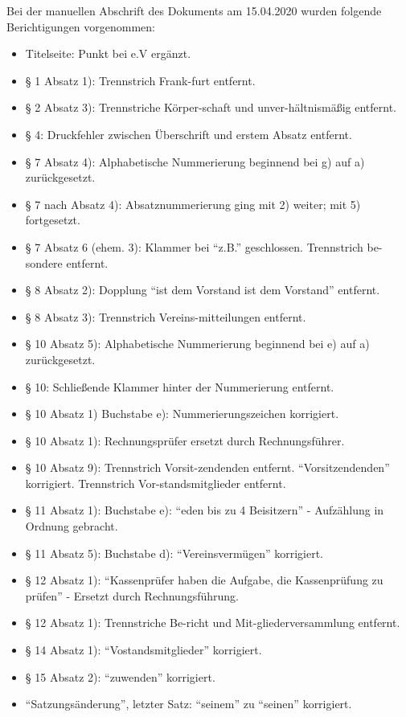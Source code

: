 \documentclass[11pt]{article}
\begin{document}
\newpage
\begin{appendix}
Bei der manuellen Abschrift des Dokuments am 15.04.2020 wurden folgende Berichtigungen vorgenommen:
\begin{itemize}
	\item Titelseite: Punkt bei e.V ergänzt.
	\item § 1 Absatz 1): Trennstrich Frank-furt entfernt.
	\item § 2 Absatz 3): Trennstriche Körper-schaft und unver-hältnismäßig entfernt.
	\item § 4: Druckfehler zwischen Überschrift und erstem Absatz entfernt.
	\item § 7 Absatz 4): Alphabetische Nummerierung beginnend bei g) auf a) zurückgesetzt.
	\item § 7 nach Absatz 4): Absatznummerierung ging mit 2) weiter; mit 5) fortgesetzt.
	\item § 7 Absatz 6 (ehem. 3): Klammer bei "`z.B."' geschlossen. Trennstrich be-sondere entfernt.
	\item § 8 Absatz 2): Dopplung "`ist dem Vorstand ist dem Vorstand"' entfernt.
	\item § 8 Absatz 3): Trennstrich Vereins-mitteilungen entfernt.
	\item § 10 Absatz 5): Alphabetische Nummerierung beginnend bei e) auf a) zurückgesetzt.
	\item § 10: Schließende Klammer hinter der Nummerierung entfernt.
	\item § 10 Absatz 1) Buchstabe e): Nummerierungszeichen korrigiert.
	\item § 10 Absatz 1): Rechnungsprüfer ersetzt durch Rechnungsführer.
	\item § 10 Absatz 9): Trennstrich Vorsit-zendenden entfernt. "`Vorsitzendenden"' korrigiert. Trennstrich Vor-standsmitglieder entfernt.
	\item § 11 Absatz 1): Buchstabe e): "`eden bis zu 4 Beisitzern"' - Aufzählung in Ordnung gebracht.
	\item § 11 Absatz 5): Buchstabe d): "`Vereinsvermügen"' korrigiert.
	\item § 12 Absatz 1): "`Kassenprüfer haben die Aufgabe, die Kassenprüfung zu prüfen"' - Ersetzt durch Rechnungsführung.
	\item § 12 Absatz 1): Trennstriche Be-richt und Mit-gliederversammlung entfernt.
	\item § 14 Absatz 1): "`Vostandsmitglieder"' korrigiert.
	\item § 15 Absatz 2): "`zuwenden"' korrigiert.
	\item "`Satzungsänderung"', letzter Satz: "`seinem"' zu "`seinen"' korrigiert.
\end{itemize}


\end{appendix}
\end{document}
